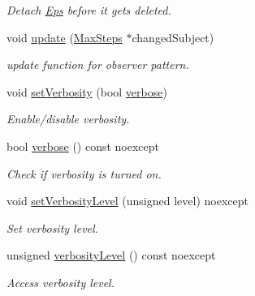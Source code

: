 \begin{DoxyCompactItemize}
\begin{DoxyCompactList}\small\item\em Detach \hyperlink{classSpacy_1_1Mixin_1_1Eps}{Eps} before it gets deleted. \end{DoxyCompactList}\item 
\hypertarget{classSpacy_1_1Mixin_1_1MaxSteps_a8e0f4d29b15dff17d4503788a9e2e081}{}void \hyperlink{classSpacy_1_1Mixin_1_1MaxSteps_a8e0f4d29b15dff17d4503788a9e2e081}{update} (\hyperlink{classSpacy_1_1Mixin_1_1MaxSteps_a8e5d8290884bdc760147862d5b9644dc_a8e5d8290884bdc760147862d5b9644dc}{Max\+Steps} $\ast$changed\+Subject)\label{classSpacy_1_1Mixin_1_1MaxSteps_a8e0f4d29b15dff17d4503788a9e2e081}

\begin{DoxyCompactList}\small\item\em update function for observer pattern. \end{DoxyCompactList}\item 
void \hyperlink{classSpacy_1_1Mixin_1_1Verbosity_a0365d293ab27e27da9496c668020aefb_a0365d293ab27e27da9496c668020aefb}{set\+Verbosity} (bool \hyperlink{classSpacy_1_1Mixin_1_1Verbosity_ad367a7328578546938fd2a7e52ab3793_ad367a7328578546938fd2a7e52ab3793}{verbose})
\begin{DoxyCompactList}\small\item\em Enable/disable verbosity. \end{DoxyCompactList}\item 
bool \hyperlink{classSpacy_1_1Mixin_1_1Verbosity_ad367a7328578546938fd2a7e52ab3793_ad367a7328578546938fd2a7e52ab3793}{verbose} () const noexcept
\begin{DoxyCompactList}\small\item\em Check if verbosity is turned on. \end{DoxyCompactList}\item 
void \hyperlink{classSpacy_1_1Mixin_1_1Verbosity_af84a4b3c933f252a5840ab63d4a38325_af84a4b3c933f252a5840ab63d4a38325}{set\+Verbosity\+Level} (unsigned level) noexcept
\begin{DoxyCompactList}\small\item\em Set verbosity level. \end{DoxyCompactList}\item 
unsigned \hyperlink{classSpacy_1_1Mixin_1_1Verbosity_a2131f495d276c95d2d6534a6dfce6f9f_a2131f495d276c95d2d6534a6dfce6f9f}{verbosity\+Level} () const noexcept
\begin{DoxyCompactList}\small\item\em Access verbosity level. \end{DoxyCompactList}\item 

\end{DoxyCompactItemize}
